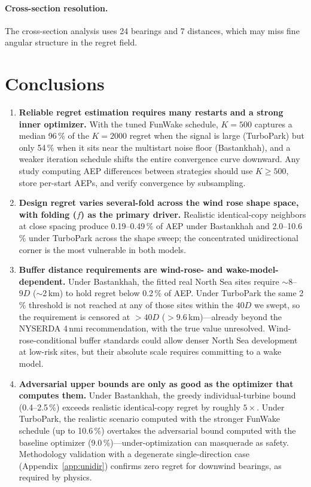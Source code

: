 \documentclass[wes, manuscript]{copernicus}
\begin{document}
\paragraph{Cross-section resolution.}
The cross-section analysis uses 24 bearings and 7 distances, which may miss fine angular structure in the regret field.


\section{Conclusions}

\begin{enumerate}
    \item \textbf{Reliable regret estimation requires many restarts and a strong inner optimizer.}
    With the tuned FunWake schedule, $K = 500$ captures a median 96\,\% of the $K = 2000$ regret when the signal is large (TurboPark) but only 54\,\% when it sits near the multistart noise floor (Bastankhah), and a weaker iteration schedule shifts the entire convergence curve downward.
    Any study computing AEP differences between strategies should use $K \geq 500$, store per-start AEPs, and verify convergence by subsampling.

    \item \textbf{Design regret varies several-fold across the wind rose shape space, with folding ($f$) as the primary driver.}
    Realistic identical-copy neighbors at close spacing produce 0.19--0.49\,\% of AEP under Bastankhah and 2.0--10.6\,\% under TurboPark across the shape sweep; the concentrated unidirectional corner is the most vulnerable in both models.

    \item \textbf{Buffer distance requirements are wind-rose- and wake-model-dependent.}
    Under Bastankhah, the fitted real North Sea sites require $\sim$$8$--$9D$ ($\sim$2\,km) to hold regret below 0.2\,\% of AEP.
    Under TurboPark the same 2\,\% threshold is not reached at any of those sites within the $40D$ we swept, so the requirement is censored at $>40D$ ($>9.6$\,km)---already beyond the NYSERDA 4\,nmi recommendation, with the true value unresolved.
    Wind-rose-conditional buffer standards could allow denser North Sea development at low-risk sites, but their absolute scale requires committing to a wake model.

    \item \textbf{Adversarial upper bounds are only as good as the optimizer that computes them.}
    Under Bastankhah, the greedy individual-turbine bound (0.4--2.5\,\%) exceeds realistic identical-copy regret by roughly $5\times$.
    Under TurboPark, the realistic scenario computed with the stronger FunWake schedule (up to 10.6\,\%) overtakes the adversarial bound computed with the baseline optimizer (9.0\,\%)---under-optimization can masquerade as safety.
    Methodology validation with a degenerate single-direction case (Appendix~\ref{app:unidir}) confirms zero regret for downwind bearings, as required by physics.


\end{enumerate}
\end{document}
